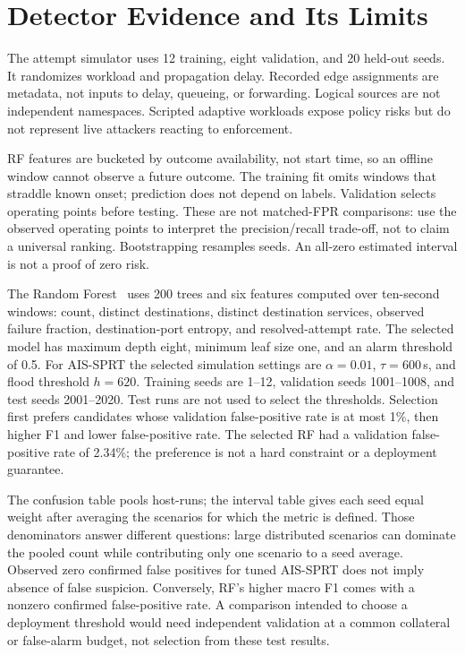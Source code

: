 \documentclass[conference]{IEEEtran}
\begin{document}
\section{Detector Evidence and Its Limits}
The attempt simulator uses 12 training, eight validation, and 20 held-out seeds. It
randomizes workload and propagation delay. Recorded edge assignments are metadata,
not inputs to delay, queueing, or forwarding. Logical sources are not independent
namespaces. Scripted adaptive workloads expose policy risks but do not represent
live attackers reacting to enforcement.

RF features are bucketed by outcome availability, not start time, so an offline
window cannot observe a future outcome. The training fit omits windows that
straddle known onset; prediction does not depend on labels. Validation selects
operating points before testing. These are not matched-FPR comparisons: use the
observed operating points to interpret the precision/recall trade-off, not to
claim a universal ranking. Bootstrapping resamples seeds. An all-zero estimated
interval is not a proof of zero risk.

The Random Forest~\cite{breiman2001random} uses 200 trees and six features
computed over ten-second windows: count, distinct destinations, distinct
destination services, observed failure fraction, destination-port entropy,
and resolved-attempt rate. The selected model has maximum depth eight,
minimum leaf size one, and an alarm threshold of 0.5. For AIS-SPRT the
selected simulation settings are $\alpha=0.01$, $\tau=600$\,s, and flood
threshold $h=620$. Training seeds are 1--12, validation seeds 1001--1008,
and test seeds 2001--2020. Test runs are not used to select the thresholds.
Selection first prefers candidates whose validation false-positive rate is
at most 1\%, then higher F1 and lower false-positive rate. The selected RF
had a validation false-positive rate of 2.34\%; the preference is not a
hard constraint or a deployment guarantee.

The confusion table pools host-runs; the interval table gives each seed
equal weight after averaging the scenarios for which the metric is defined.
Those denominators answer
different questions: large distributed scenarios can dominate the pooled
count while contributing only one scenario to a seed average. Observed
zero confirmed false positives for tuned AIS-SPRT does not imply absence
of false suspicion. Conversely, RF's higher macro F1 comes with a nonzero
confirmed false-positive rate. A comparison intended to choose a deployment
threshold would need independent validation at a common collateral or
false-alarm budget, not selection from these test results.
\end{document}
